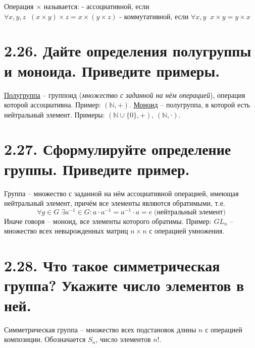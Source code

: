 \documentclass{article}
\begin{document}
Операция $\times$ называется:
\newline - ассоциативной, если $\forall x,y,z \;\; (x \times y) \times z = x \times (y \times z)$
\newline - коммутативной, если $\forall x,y \;\; x \times y = y \times x$

\section*{\LARGE 2.26. Дайте определения полугруппы и моноида. Приведите примеры. }

\underline{Полугруппа} -- группоид (\textit{множество с заданной на нём операцией}), операция которой ассоциативна. Пример: $(\mathbb{N}, +)$.
\newline \underline{Моноид} -- полугруппа, в которой есть нейтральный элемент.
\newline Примеры: $(\mathbb{N}\cup \{0\}, +),\, (\mathbb{N}, \cdot)$.

\section*{\LARGE 2.27. Сформулируйте определение группы. Приведите пример. }

Группа -- множество с заданной на нём ассоциативной операцией, имеющая нейтральный элемент, причём все элементы являются обратимыми, т.е. 
$$
\forall g \in G \; \exists a^{-1} \in G : a \cdot a^{-1} = a^{-1} \cdot a = e \; \mbox{(нейтральный элемент)}
$$
Иначе говоря -- моноид, все элементы которого обратимы.
\newline Пример: $GL_n$ -- множество всех невырожденных матриц $n \times n$ с операцией умножения.

\section*{\LARGE 2.28. Что такое симметрическая группа? Укажите число элементов в ней.  }

Симметрическая группа -- множество всех подстановок длины $n$ с операцией композиции. Обозначается $S_n$, число элементов $n!$.

\end{document}
